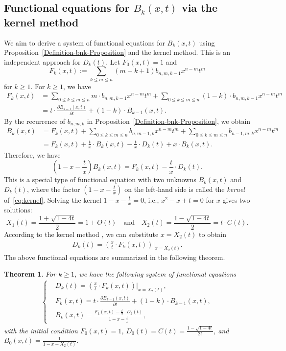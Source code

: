 \documentclass[reqno, 12pt]{article}
\newtheorem{thm}{Theorem}[section]
\theoremstyle{mydefinition}
\theoremstyle{myremark}
\numberwithin{algorithm}{section}
\begin{document}
\subsection{Functional equations for $B_k(x,t)$ via the kernel method}
\label{subsection-recurrence-gf}

We aim to derive a system of functional equations for $B_k(x,t)$ using Proposition~\ref{Definition-bnk-Proposition} and the kernel method.
This is an independent approach for $D_k(t)$.
Let $F_0(x,t)=1$ and
$$ F_k(x,t):=\sum_{ k\leq m\leq n} (m-k+1)b_{n,m,k-1} x^{n-m}t^m$$
for $k\geq1$.
For $k\geq 1$, we have
\begin{align*}
F_k(x,t)&=\sum_{0\leq k\leq m\leq n} m\cdot b_{n,m,k-1} x^{n-m}t^m +\sum_{0\leq k\leq m\leq n} (1-k)\cdot b_{n,m,k-1} x^{n-m}t^m
\\ &= t\cdot \frac{\partial B_{k-1}(x,t)}{\partial t}+(1-k)\cdot B_{k-1}(x,t).
\end{align*}
By the recurrence of $b_{n,m,k}$ in Proposition~\ref{Definition-bnk-Proposition}, we obtain
\begin{align*}
B_k(x,t)&=F_k(x,t) +\sum_{0\leq k\leq m\leq n} b_{n,m-1,k} x^{n-m}t^m + \sum_{0\leq k\leq m\leq n} b_{n-1,m,k} x^{n-m}t^m
\\ &=F_k(x,t) + \frac{t}{x}\cdot B_k(x,t)-\frac{t}{x}\cdot D_k(t) +x\cdot B_k(x,t).
\end{align*}
Therefore, we have
\begin{equation}\label{eq:kernel}
\left(1-x-\frac{t}{x}\right)B_k(x,t)=F_k(x,t)-\frac{t}{x}\cdot D_k(t).
\end{equation}
This is a special type of functional equation with two unknowns $B_k(x,t)$ and $D_k(t)$, where
the factor $\left( 1-x-\frac{t}{x}\right)$ on the left-hand side is called the \emph{kernel} of~\eqref{eq:kernel}.
Solving the kernel $1-x-\frac{t}{x}=0$, i.e., $x^2-x+t=0$ for $x$ gives two solutions:
$$X_1(t)=\frac{1+\sqrt{1-4t}}{2}=1+O(t) \quad \text{and} \quad X_2(t)=\frac{1-\sqrt{1-4t}}{2}=t\cdot C(t).$$
According to the kernel method \cite{Bousquet2000}, we can substitute $x=X_2(t)$ to obtain
\begin{align*}
D_k(t)=\left(\frac{x}{t} \cdot F_k(x,t) \right)\Big|_{x=X_2(t)}.
\end{align*}
The above functional equations are summarized in the following theorem.
\begin{thm}\label{Genereating-function-Dkt}
For $k\geq 1$, we have the following system of functional equations
\begin{align*}
\left\{
\begin{aligned}
& D_k(t)=\left(\frac{x}{t} \cdot F_k(x,t) \right)\Big|_{x=X_2(t)}, \\
& F_k(x,t)= t\cdot \frac{\partial B_{k-1}(x,t)}{\partial t}+(1-k)\cdot B_{k-1}(x,t),\\
& B_k(x,t)=\frac{F_k(x,t)-\frac{t}{x}\cdot D_k(t)}{1-x-\frac{t}{x}},
\end{aligned}
\right.
\end{align*}
with the initial condition $F_0(x,t)=1$, $D_0(t)=C(t)=\frac{1-\sqrt{1-4t}}{2t}$, and $B_0(x,t)=\frac{1}{1-x-X_2(t)}$.
\end{thm}
\end{document}
